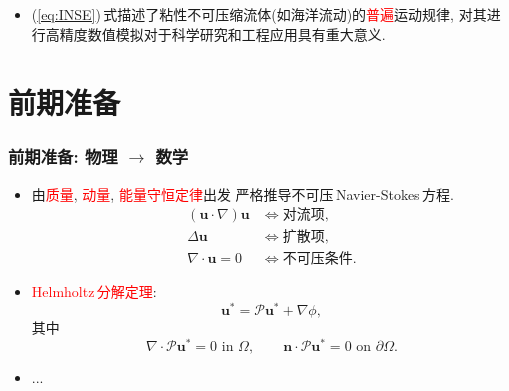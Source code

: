 \documentclass{beamer}
\begin{document}
\begin{CJK*}{UTF8}{gkai}
\begin{frame}
\begin{itemize}
      
    \item
      (\ref{eq:INSE})\,式描述了粘性不可压缩流体(如海洋流动)的\textcolor{red}{普遍}运动规律,
      对其进行高精度数值模拟对于科学研究和工程应用具有重大意义.
    \end{itemize}
  \end{frame}

  \section{前期准备}
  \begin{frame}
    \frametitle{前期准备: 物理 $\rightarrow$ 数学}
    \begin{itemize}
    \item
      由\textcolor{red}{质量}, \textcolor{red}{动量}, \textcolor{red}{能量守恒定律}出发
      严格推导不可压\,Navier-Stokes\,方程.
      \begin{align*}
        \left( \bm{u}\cdot\nabla \right)\bm{u} &\Leftrightarrow \text{对流项}, \\
        \Delta \bm{u} &\Leftrightarrow \text{扩散项}, \\
        \nabla\cdot \bm{u}=0 &\Leftrightarrow \text{不可压条件}.
      \end{align*}
    \item
      \textcolor{red}{Helmholtz\,分解定理}:
      \begin{equation*}
        \bm{u}^{*} = \mathscr{P}\bm{u}^{*}+\nabla\phi,
      \end{equation*}
      其中
      \begin{equation*}
        \nabla\cdot \mathscr{P}\bm{u}^{*}=0 \text{ in } \Omega, \qquad
        \bm{n}\cdot \mathscr{P}\bm{u}^{*} = 0 \text{ on } \partial\Omega.
      \end{equation*}
    \item ...
    \end{itemize}
  \end{frame}


\end{CJK*}
\end{document}
